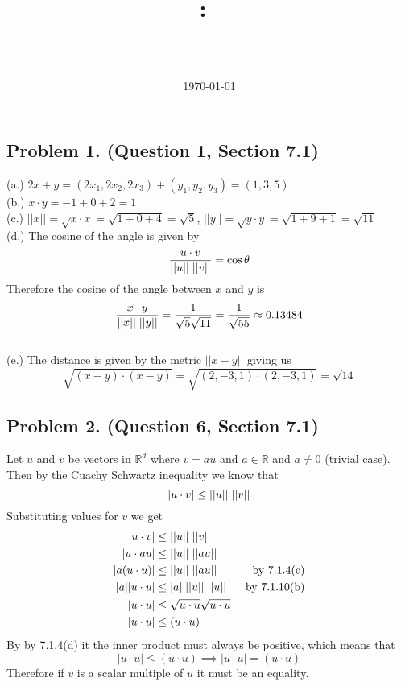 \documentclass{article}
\title{
    \vspace{2in}
    \textmd{\textbf{\hmwkClass:\ \hmwkTitle}}\\
    \vspace{0.1in}\large{\textit{\hmwkClassInstructor\ \hmwkClassTime}}
    \vspace{3in}    
    \author{\textbf{\hmwkAuthorName}}
    \date{\today}
}
\begin{document}
	\maketitle
	\pagebreak

\subsection*{Problem 1. (Question 1, Section 7.1)}
(a.) $2x+y = (2x_1, 2x_2, 2x_3) + (y_1, y_2, y_3) = (1,3,5)$\\
(b.) $x\cdot y = -1 + 0 + 2 = 1$\\
(c.) $||x|| = \sqrt{x\cdot x} = \sqrt{1+0+4} = \sqrt{5}$,  $||y|| = \sqrt{y\cdot y} = \sqrt{1+9+1} = \sqrt{11}$\\
(d.) The cosine of the angle is given by 
\[
\frac{u \cdot v}{||u||\hspace{.1cm} ||v||} = \cos \theta
\]
Therefore the cosine of the angle between $x$ and $y$ is
\[
\frac{x \cdot y}{||x||\hspace{.1cm} ||y||} = \frac{1}{\sqrt{5}\sqrt{11}} = \frac{1}{\sqrt{55}}\approx 0.13484
\]\\
(e.) The distance is given by the metric $||x-y||$ giving us 
\[
\sqrt{(x-y) \cdot (x-y)} = \sqrt{(2,-3,1) \cdot (2,-3,1)} = \sqrt{14}
\]

\subsection*{Problem 2. (Question 6, Section 7.1)}
Let $u$ and $v$ be vectors in $\mathbb{R}^d$ where $v=au$ and $a\in\mathbb{R}$ and $a\neq0$ (trivial case). Then by the Cuachy Schwartz inequality we know that
\[
|u\cdot v| \leq ||u||\hspace{.1cm}||v||
\]
Substituting values for $v$ we get
\begin{align*}
	|u\cdot v|			 &\leq	 ||u||\hspace{.1cm}||v||  \\
	|u\cdot au|		   &\leq   ||u||\hspace{.1cm}||au||  \\
	|a(u\cdot u)|	  &\leq	  ||u||\hspace{.1cm}||au||  &\text{ by 7.1.4(c)}\\
	|a||u\cdot u|	&\leq	|a|\hspace{.1cm}||u||\hspace{.1cm}||u||  &\text{ by 7.1.10(b)}\\
	|u\cdot u|	&\leq	\sqrt{u\cdot u}\sqrt{u \cdot u} \\
	|u\cdot u|	&\leq	(u\cdot u)
\end{align*}
By by 7.1.4(d) it the inner product must always be positive, which means that 
\[
|u\cdot u|	\leq	(u\cdot u) \implies |u\cdot u|	= (u\cdot u)
\]
Therefore if $v$ is a scalar multiple of $u$ it must be an equality.
\end{document}
